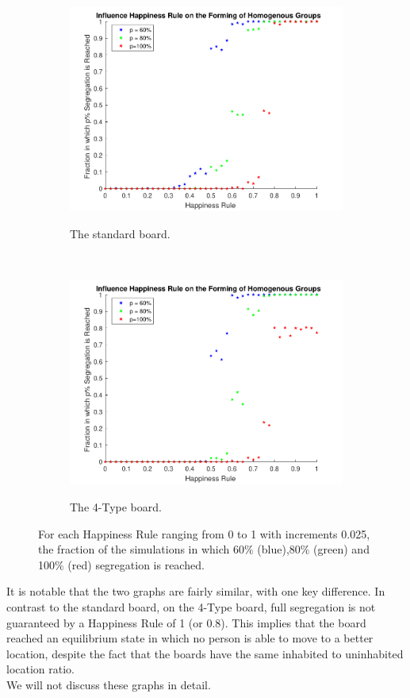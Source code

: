 \begin{figure}[H]
	\centering
	\begin{subfigure}{0.4\textwidth}
    \includegraphics[width=\textwidth]{happy_segr_60_80_100.pdf}
    \label{fig:happysegsc}
    \caption{The standard board.}
    \end{subfigure}
    ~
    \begin{subfigure}{0.4\textwidth}
    \includegraphics[width=\textwidth]{happy_segr_60_80_100_4b.pdf}
    \label{fig:happyseg4c}
    \caption{The 4-Type board.}
    \end{subfigure}
    \caption{For each Happiness Rule ranging from 0 to 1 with increments 0.025, the fraction of the simulations in which 60$\%$ (blue),80$\%$ (green) and 100$\%$ (red) segregation is reached.}
    \label{fig:happysegr}
\end{figure}
It is notable that the two graphs are fairly similar, with one key difference. In contrast to the standard board, on the 4-Type board, full segregation is not guaranteed by a Happiness Rule of 1 (or 0.8). This implies that the board reached an equilibrium state in which no person is able to move to a better location, despite the fact that the boards have the same inhabited to uninhabited location ratio.\\
We will not discuss these graphs in detail.


